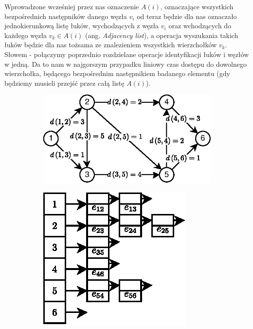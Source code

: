 Wprowadzone wcześniej przez nas oznaczenie $A \left( i \right) $, oznaczające wszystkich bezpośrednich następników danego węzła $v_{i}$ od teraz będzie dla nas oznaczało jednokierunkową listę łuków, wychodzących z węzła $v_{i}$ oraz wchodzących do każdego węzła $v_{k} \in A \left( i \right)$ (ang. \textit{Adjacency list}), a operacja wyszukania takich łuków będzie dla nas tożsama ze znalezieniem wszystkich wierzchołków $v_{k}$. Słowem - połączymy poprzednio rozdzielane operacje identyfikacji łuków i węzłów w jedną. Da to nam w najgorszym przypadku liniowy czas dostępu do dowolnego wierzchołka, będącego bezpośrednim następnikiem badanego elementu (gdy będziemy musieli przejść przez całą listę $A \left( i \right) $). 

\begin{figure}[!htbp]
	\centering
	\begin{subfigure}[b]{0.57\textwidth}
		\includegraphics[width=\textwidth]{Chapter_I/3/1_3a.eps}
		\caption{}
	\end{subfigure}%
	\qquad
	\begin{subfigure}[b]{0.33\textwidth}
		\includegraphics[width=\textwidth]{Chapter_I/3/1_3b.eps}

\end{subfigure}
\end{figure}
